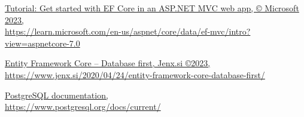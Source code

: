 \documentclass[12pt, a4paper]{report}
\theoremstyle{definition}
\begin{document}
\begin{thebibliography}{80}
     \href{https://learn.microsoft.com/en-us/aspnet/core/data/ef-mvc/intro?view=aspnetcore-7.0}{\color{black}Tutorial: Get started with EF Core in an ASP.NET MVC web app, © Microsoft 2023, \\https://learn.microsoft.com/en-us/aspnet/core/data/ef-mvc/intro?view=aspnetcore-7.0}

     \href{https://www.jenx.si/2020/04/24/entity-framework-core-database-first/}{\color{black}Entity Framework Core – Database first, Jenx.si ©2023, \\https://www.jenx.si/2020/04/24/entity-framework-core-database-first/}
   
     \href{ https://www.postgresql.org/docs/current/}{\color{black}PostgreSQL documentation,\\ https://www.postgresql.org/docs/current/}

 
\end{thebibliography}
\end{document}
